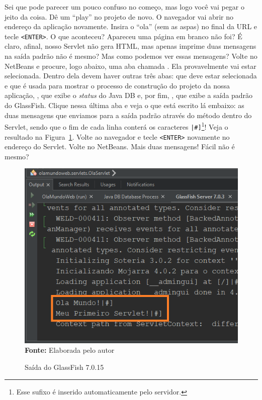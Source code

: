 Sei que pode parecer um pouco confuso no começo, mas logo você vai pegar o jeito da coisa. Dê um ``play'' no projeto de novo. O navegador vai abrir no endereço da aplicação novamente. Insira o ``ola'' (sem as aspas) no final da URL e tecle \texttt{<ENTER>}. O que aconteceu? Apareceu uma página em branco não foi? É claro, afinal, nosso Servlet não gera HTML, mas apenas imprime duas mensagens na saída padrão não é mesmo? Mas como podemos ver essas mensagens? Volte no NetBeans e procure, logo abaixo, uma aba chamada . Ela provavelmente vai estar selecionada. Dentro dela devem haver outras três abas:  que deve estar selecionada e que é usada para mostrar o processo de construção do projeto da nossa aplicação, , que exibe o \textit{status} do Java DB e, por fim, , que exibe a saída padrão do GlassFish. Clique nessa última aba e veja o que está escrito lá embaixo: as duas mensagens que enviamos para a saída padrão através do método  dentro do Servlet, sendo que o fim de cada linha conterá os caracteres \texttt{|\#]}\footnote{Esse sufixo é inserido automaticamente pelo servidor.}! Veja o resultado na Figura~\ref{fig:cap01SaidaGlassFish}. Volte ao navegador e tecle \texttt{<ENTER>} novamente no endereço do Servlet. Volte no NetBeans. Mais duas mensagens! Fácil não é mesmo?

\FloatBarrier
\begin{figure}[!htbp]
    \centering
    \caption{Saída do GlassFish 7.0.15}
    \includegraphics[scale=0.9]{imagens/cap01SaidaGlassFish}
    \\\textbf{Fonte:} Elaborada pelo autor
    \label{fig:cap01SaidaGlassFish}
\end{figure}
\FloatBarrier
    
